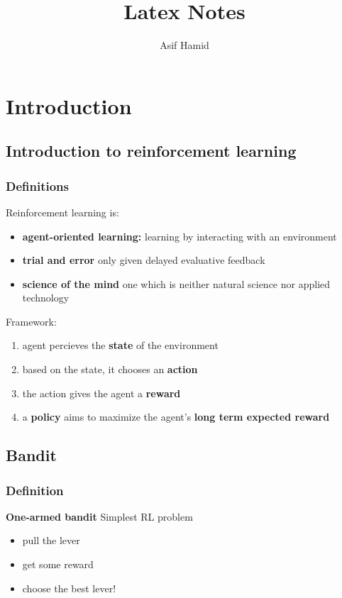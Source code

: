 \documentclass[10pt,a4paper]{report}
\title{Latex Notes }
\author{Asif Hamid}
\begin{document}
\maketitle
\newpage
\tableofcontents


\chapter{Introduction}
\section{Introduction to reinforcement learning}
\label{sec:introduction}
\subsection{Definitions}
\label{sub:definitions}
Reinforcement learning is:
\begin{itemize}
    \item \textbf{agent-oriented learning:} learning by interacting with an environment
    \item \textbf{trial and error} only given delayed evaluative feedback
    \item \textbf{science of the mind} one which is neither natural science nor applied technology
\end{itemize}

Framework:
\begin{enumerate}
    \item agent percieves the \textbf{state} of the environment
    \item based on the state, it chooses an \textbf{action}
    \item the action gives the agent a \textbf{reward}
    \item a \textbf{policy} aims to maximize the agent's \textbf{long term expected reward}
\end{enumerate}
\section{Bandit}
\label{sec:bandit}

\subsection{Definition}
\label{sub:definition}

\textbf{One-armed bandit} Simplest RL problem
\begin{itemize}
    \item pull the lever
    \item get some reward
    \item choose the best lever!
\end{itemize}
\end{document}

